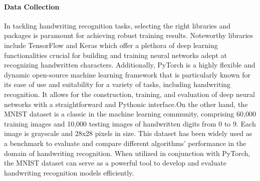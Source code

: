 \documentclass[12pt]{article}
\begin{document}
\paragraph{Data Collection}
In tackling handwriting recognition tasks, selecting the right libraries and packages is paramount for achieving robust training results. Noteworthy libraries include TensorFlow and Keras which offer a plethora of deep learning functionalities crucial for building and training neural networks adept at recognizing handwritten characters. Additionally, PyTorch is a highly flexible and dynamic open-source machine learning framework that is particularly known for its ease of use and suitability for a variety of tasks, including handwriting recognition. It allows for the construction, training, and evaluation of deep neural networks with a straightforward and Pythonic interface.On the other hand, the MNIST dataset is a classic in the machine learning community, comprising 60,000 training images and 10,000 testing images of handwritten digits from 0 to 9. Each image is grayscale and 28x28 pixels in size. This dataset has been widely used as a benchmark to evaluate and compare different algorithms' performance in the domain of handwriting recognition. When utilized in conjunction with PyTorch, the MNIST dataset can serve as a powerful tool to develop and evaluate handwriting recognition models efficiently. 
\end{document}
